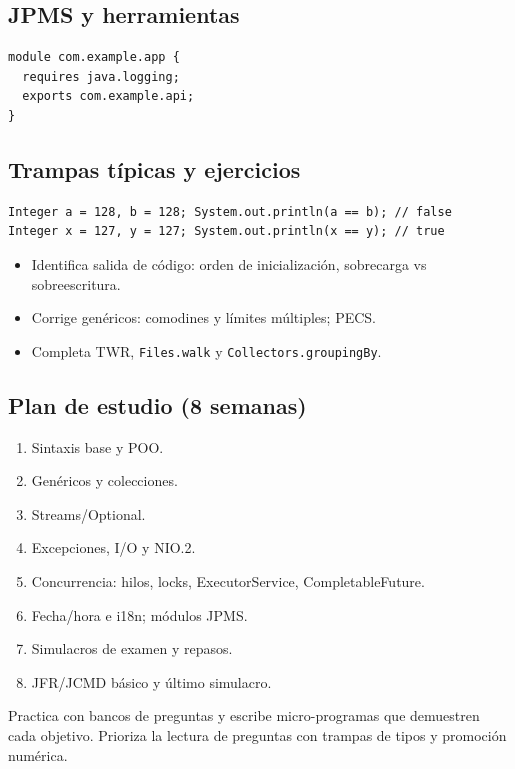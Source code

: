 \documentclass[11pt,a4paper]{article}
\begin{document}
\subsection{JPMS y herramientas}
\begin{lstlisting}[style=javastyle, caption={module-info.java mínimo}]
module com.example.app {
  requires java.logging;
  exports com.example.api;
}
\end{lstlisting}

\subsection{Trampas típicas y ejercicios}
\begin{lstlisting}[style=javastyle, caption={Autoboxing y cache de Integer}]
Integer a = 128, b = 128; System.out.println(a == b); // false
Integer x = 127, y = 127; System.out.println(x == y); // true
\end{lstlisting}

\begin{itemize}[leftmargin=*]
  \item Identifica salida de código: orden de inicialización, sobrecarga vs sobreescritura.
  \item Corrige genéricos: comodines y límites múltiples; PECS.
  \item Completa TWR, \texttt{Files.walk} y \texttt{Collectors.groupingBy}.
\end{itemize}

\subsection{Plan de estudio (8 semanas)}
\begin{enumerate}[leftmargin=*]
  \item Sintaxis base y POO.  \item Genéricos y colecciones.
  \item Streams/Optional. \item Excepciones, I/O y NIO.2.
  \item Concurrencia: hilos, locks, ExecutorService, CompletableFuture.
  \item Fecha/hora e i18n; módulos JPMS.
  \item Simulacros de examen y repasos.
  \item JFR/JCMD básico y último simulacro.
\end{enumerate}

\begin{tipbox}
Practica con bancos de preguntas y escribe micro-programas que demuestren cada objetivo. Prioriza la lectura de preguntas con trampas de tipos y promoción numérica.
\end{tipbox}
\end{document}
